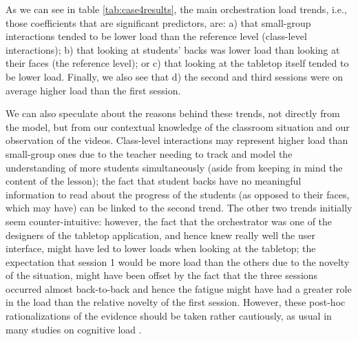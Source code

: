 \documentclass[10pt,journal,compsoc]{IEEEtran}
\begin{document}
As we can see in table \ref{tab:case4results}, the main orchestration load trends, i.e., those coefficients that are significant predictors, are: a) that small-group interactions tended to be lower load than the reference level (class-level interactions); b) that looking at students' backs was lower load than looking at their faces (the reference level); or c) that looking at the tabletop itself tended to be lower load. Finally, we also see that d) the second and third sessions were on average higher load than the first session.

We can also speculate about the reasons behind these trends, not directly from the model, but from our contextual knowledge of the classroom situation and our observation of the videos. Class-level interactions may represent higher load than small-group ones due to the teacher needing to track and model the understanding of more students simultaneously (aside from keeping in mind the content of the lesson); the fact that student backs have no meaningful information to read about the progress of the students (as opposed to their faces, which may have) can be linked to the second trend. The other two trends initially seem counter-intuitive: however, the fact that the orchestrator was one of the designers of the tabletop application, and hence knew really well the user interface, might have led to lower loads when looking at the tabletop; the expectation that session 1 would be more load than the others due to the novelty of the situation, might have been offset by the fact that the three sessions occurred almost back-to-back and hence the fatigue might have had a greater role in the load than the relative novelty of the first session. However, these post-hoc rationalizations of the evidence should be taken rather cautiously, as usual in many studies on cognitive load \cite{de2010cognitive}.
\end{document}
